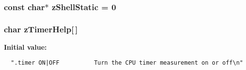 \subsubsection{\setlength{\rightskip}{0pt plus 5cm}const char$\ast$ \bf{z\-Shell\-Static} = 0\hspace{0.3cm}{\tt  [static]}}\label{shell_8c_7fcc02f813362fbca7ab2966c6abc6ff}


\subsubsection{\setlength{\rightskip}{0pt plus 5cm}char \bf{z\-Timer\-Help}[$\,$]\hspace{0.3cm}{\tt  [static]}}\label{shell_8c_bdc9ce25e5f1de0d6821fdd674f8b486}


\textbf{Initial value:}

\begin{Code}\begin{verbatim}
  ".timer ON|OFF          Turn the CPU timer measurement on or off\n"
\end{verbatim}\end{Code}
